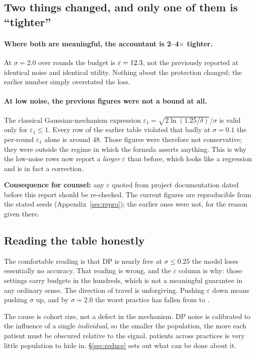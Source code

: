 \subsection{Two things changed, and only one of them is ``tighter''}

\paragraph{Where both are meaningful, the accountant is 2--4$\times$ tighter.}
At $\sigma = 2.0$ over \DPRounds{} rounds the budget is $\varepsilon = 12.3{}$, not the
\EpsAtSigmaTwoNaive{} previously reported at identical noise and identical utility. Nothing about
the protection changed; the earlier number simply overstated the loss.

\paragraph{At low noise, the previous figures were not a bound at all.}
The classical Gaussian-mechanism expression $\varepsilon_1 = \sqrt{2\ln(1.25/\delta)}/\sigma$ is
valid only for $\varepsilon_1 \le 1$. Every row of the earlier table violated that badly at
$\sigma = 0.1$ the per-round $\varepsilon_1$ alone is around 48. Those figures were therefore not
conservative; they were outside the regime in which the formula asserts anything. This is why the
low-noise rows now report a \emph{larger} $\varepsilon$ than before, which looks like a regression
and is in fact a correction.

\textbf{Consequence for counsel:} any $\varepsilon$ quoted from project documentation dated before
this report should be re-checked. The current figures are reproducible from the stated seeds
(Appendix~\ref{sec:repro}); the earlier ones were not, for the reason given there.

\subsection{Reading the table honestly}

The comfortable reading is that DP is nearly free at $\sigma \le 0.25$ the model loses
essentially no accuracy. That reading is wrong, and the $\varepsilon$ column is why: those settings
carry budgets in the hundreds, which is not a meaningful guarantee in any ordinary sense. The
direction of travel is unforgiving. Pushing $\varepsilon$ down means pushing $\sigma$ up, and by
$\sigma = 2.0$ the worst practice has fallen from \BestFedWorst{} to \WorstAtSigmaTwo{}.

The cause is cohort size, not a defect in the mechanism. DP noise is calibrated to the influence of a
single \emph{individual}, so the smaller the population, the more each patient must be obscured
relative to the signal. \NumPatients{} patients across \NumPractices{} practices is very little
population to hide in. \S\ref{sec:reduce} sets out what can be done about it.
